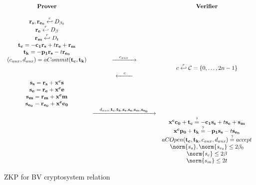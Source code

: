 \begin{figure}[h]
  \centering
  \begin{equation*}
    \begin{array}{c c c}
      \text{\textbf{Prover}} & & \text{\textbf{Verifier}} \\
      \\
      \mathbf{r_s,r_{e_0}} \randomsample D_{\beta_0} & & \\
      \mathbf{r_e} \randomsample D_{\beta} & & \\
      \mathbf{r_m} \randomsample D_{t} & & \\
      \mathbf{t_c} = \mathbf{-c_1r_s} + t\mathbf{r_e + r_m} & & \\
      \mathbf{t_k} = \mathbf{-p_1r_s} - t\mathbf{r_{e_0}} & & \\
      (c_{aux}, d_{aux}) = aCommit(\mathbf{t_c,t_k}) &
                                                       \xrightarrow{\hspace{1em}c_{aux}\hspace{1em}} & \\
                             & & c \randomsample \mathcal{C} = \left\{ 0,\dots, 2n -1  \right\}\\
                             &  \xleftarrow{\hspace{1em}c\hspace{1em}} & \\
      \mathbf{s_s = r_s + x^cs} & & \\
      \mathbf{s_e = r_e + x^ce} & & \\
      \mathbf{s_m = r_m + x^cm} & & \\
      \mathbf{s_{e_0} = r_{e_0} + x^ce_0} & & \\
                             & \xrightarrow{\hspace{1em}d_{aux}, \mathbf{t_c, t_k, s_s, s_e, s_m,
                               s_{e_0}}\hspace{1em}} & \\
                             & & \mathbf{x^cc_0} + \mathbf{t_c} \stackrel{?}{=} -\mathbf{c_1s_s} +t\mathbf{s_e} +
                                 \mathbf{s_m}\\
                             & & \mathbf{x^cp_0} + \mathbf{t_k} \stackrel{?}{=} -\mathbf{p_1s_s}
                                 -t\mathbf{s_{e_0}}\\
                             & & aCOpen(\mathbf{t_c, t_k}, c_{aux}, d_{aux}) \stackrel{?}{=} accept \\
                             & & \norm{s_s}, \norm{s_{e_0}} \leq 2\beta_0 \\
                             & & \norm{s_e} \leq 2\beta \\
                             & & \norm{s_m} \leq 2t
    \end{array}
  \end{equation*}
  \caption{ZKP for BV cryptosystem relation}
  \label{fig:belhamoudaProtocol}
\end{figure}



